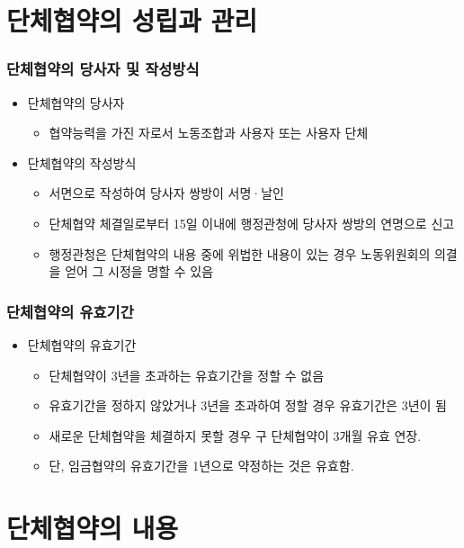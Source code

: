 \documentclass[aspectratio=169,xcolor=dvipsnames,handout]{beamer}
\begin{document}
\section{단체협약의 성립과 관리}

\begin{frame}
    \frametitle{단체협약의 당사자 및 작성방식}
    \begin{itemize}[<+->]
        \item 단체협약의 당사자
        \begin{itemize}[<+->]
            \item 협약능력을 가진 자로서 노동조합과 사용자 또는 사용자 단체
        \end{itemize}
        \item 단체협약의 작성방식
        \begin{itemize}[<+->]
            \item 서면으로 작성하여 당사자 쌍방이 서명·날인
            \item 단체협약 체결일로부터 15일 이내에 행정관청에 당사자 쌍방의 연명으로 신고
            \item 행정관청은 단체협약의 내용 중에 위법한 내용이 있는 경우 노동위원회의 의결을 얻어 그 시정을 명할 수 있음
        \end{itemize}
    \end{itemize}
\end{frame}

\begin{frame}
    \frametitle{단체협약의 유효기간}
    \begin{itemize}[<+->]
        \item 단체협약의 유효기간
        \begin{itemize}[<+->]
            \item 단체협약이 3년을 초과하는 유효기간을 정할 수 없음
            \item 유효기간을 정하지 않았거나 3년을 초과하여 정할 경우 유효기간은 3년이 됨
            \item 새로운 단체협약을 체결하지 못할 경우 구 단체협약이 3개월 유효 연장.
            \item 단, 임금협약의 유효기간을 1년으로 약정하는 것은 유효함.
        \end{itemize}
    \end{itemize}
    
\end{frame}

\section{단체협약의 내용}
\end{document}
